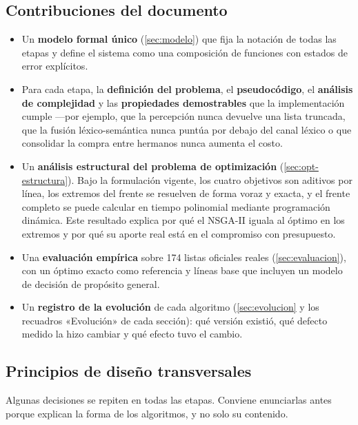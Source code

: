 \subsection{Contribuciones del documento}

\begin{itemize}
  \item Un \textbf{modelo formal único} (\cref{sec:modelo}) que fija la
        notación de todas las etapas y define el sistema como una composición
        de funciones con estados de error explícitos.
  \item Para cada etapa, la \textbf{definición del problema}, el
        \textbf{pseudocódigo}, el \textbf{análisis de complejidad} y las
        \textbf{propiedades demostrables} que la implementación cumple
        ---por ejemplo, que la percepción nunca devuelve una lista truncada, que
        la fusión léxico-semántica nunca puntúa por debajo del canal léxico o
        que consolidar la compra entre hermanos nunca aumenta el costo.
  \item Un \textbf{análisis estructural del problema de optimización}
        (\cref{sec:opt-estructura}). Bajo la formulación vigente, los cuatro
        objetivos son aditivos por línea, los extremos del frente se resuelven
        de forma voraz y exacta, y el frente completo se puede calcular en
        tiempo polinomial mediante programación dinámica. Este resultado
        explica por qué el NSGA-II iguala al óptimo en los extremos y por qué
        su aporte real está en el compromiso con presupuesto.
  \item Una \textbf{evaluación empírica} sobre 174 listas oficiales reales
        (\cref{sec:evaluacion}), con un óptimo exacto como referencia y líneas
        base que incluyen un modelo de decisión de propósito general.
  \item Un \textbf{registro de la evolución} de cada algoritmo
        (\cref{sec:evolucion} y los recuadros «Evolución» de cada sección):
        qué versión existió, qué defecto medido la hizo cambiar y qué efecto
        tuvo el cambio.
\end{itemize}

\subsection{Principios de diseño transversales}
\label{sec:principios}

Algunas decisiones se repiten en todas las etapas. Conviene enunciarlas antes
porque explican la forma de los algoritmos, y no solo su contenido.

